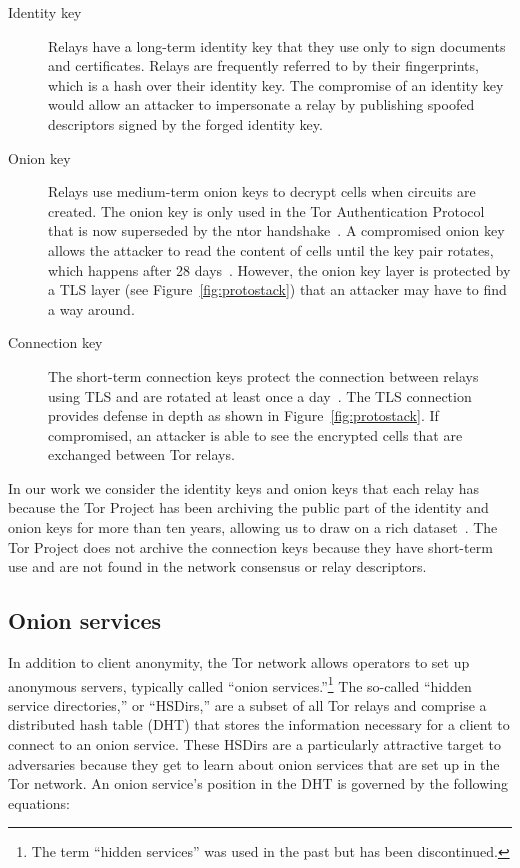 \begin{description}
	\item[Identity key] Relays have a long-term identity key that they use only
		to sign documents and certificates.  Relays are frequently referred to
		by their fingerprints, which is a hash over their identity key.  The
		compromise of an identity key would allow an attacker to impersonate a
		relay by publishing spoofed descriptors signed by the forged identity
		key.

	\item[Onion key] Relays use medium-term onion keys to decrypt cells when
		circuits are created.  The onion key is only used in the Tor
		Authentication Protocol that is now superseded by the ntor
		handshake~\cite{Goldberg2013a}.  A compromised onion key allows the
		attacker to read the content of cells until the key pair rotates, which
		happens after 28 days~\cite[\S~3.4.1]{dir-spec}.
		However, the onion key layer is protected by a TLS layer (see
		Figure~\ref{fig:protostack}) that an attacker may have to find a way
		around.

	\item[Connection key] The short-term connection keys protect the connection
		between relays using TLS and are rotated at least once a
		day~\cite[\S~1.1]{torspec}.  The TLS connection provides defense in
		depth as shown in Figure~\ref{fig:protostack}.  If compromised, an
		attacker is able to see the encrypted cells that are exchanged between
		Tor relays.
\end{description}

In our work we consider the identity keys and onion keys that each relay has
because the Tor Project has been archiving the public part of the identity and
onion keys for more than ten years, allowing us to draw on a rich
dataset~\cite{collector}. The Tor Project does not archive the connection keys
because they have short-term use and are not found in the network consensus or
relay descriptors.

\subsection{Onion services}
In addition to client anonymity, the Tor network allows operators to set up
anonymous servers, typically called ``onion services.''\footnote{The term ``hidden
services'' was used in the past but has been discontinued.} 
The so-called ``hidden service directories,'' or ``HSDirs,'' are a subset of all
Tor relays and comprise a distributed hash table (DHT) that stores the
information necessary for a client to connect to an onion service.  These HSDirs
are a particularly attractive target to adversaries because they get to learn
about onion services that are set up in the Tor network.  An onion service's
position in the DHT is governed by the following equations:

